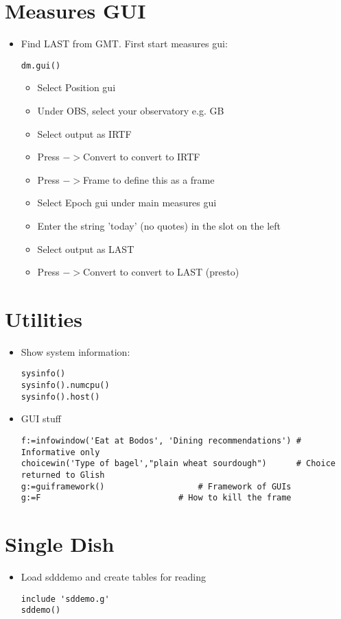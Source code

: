 \section{Measures GUI}

\begin{itemize}
\item Find LAST from GMT. First start measures gui:
\begin{verbatim}
dm.gui()
\end{verbatim}
\begin{itemize}
\item Select Position gui
\item Under OBS, select your observatory e.g. GB
\item Select output as IRTF
\item Press $->$Convert to convert to IRTF
\item Press $->$Frame to define this as a frame
\item Select Epoch gui under main measures gui
\item Enter the string 'today' (no quotes) in the slot on
the left
\item Select output as LAST
\item Press $->$Convert to convert to LAST (presto)
\end{itemize}
\end{itemize}

\section{Utilities}

\begin{itemize}
\item Show system information:
\begin{verbatim}
sysinfo()
sysinfo().numcpu()
sysinfo().host()
\end{verbatim}
\item GUI stuff
\begin{verbatim}
f:=infowindow('Eat at Bodos', 'Dining recommendations') # Informative only
choicewin('Type of bagel',"plain wheat sourdough")      # Choice returned to Glish
g:=guiframework()					# Framework of GUIs
g:=F							# How to kill the frame
\end{verbatim}
\end{itemize}

\section{Single Dish}

\begin{itemize}
\item Load sdddemo and create tables for reading
\begin{verbatim}
include 'sddemo.g'
sddemo()
\end{verbatim}
\end{itemize}
